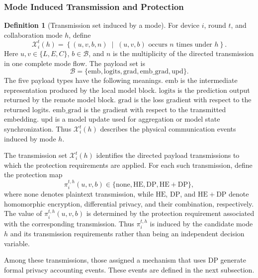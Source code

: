 \documentclass[5p,times]{elsarticle}
\theoremstyle{plain}
\theoremstyle{definition}
\newtheorem{definition}[theorem]{Definition}
\theoremstyle{remark}
\begin{document}
\subsubsection{Mode Induced Transmission and Protection}
\begin{definition}[Transmission set induced by a mode]
For device \(i\), round \(t\), and collaboration mode \(h\), define
\begin{equation}
\mathcal X_i^t(h)
=
\left\{
(u,v,b,n)
\;\middle|\;
(u,v,b)\text{ occurs }n\text{ times under }h
\right\}.
\label{eq:transmission_set}
\end{equation}
Here \(u,v\in\{L,E,C\}\), \(b\in\mathcal B\), and \(n\) is the multiplicity of the directed transmission in one complete mode flow.
The payload set is
\begin{equation*}
\mathcal B=
\{\mathrm{emb},\mathrm{logits},\mathrm{grad},
\mathrm{emb\_grad},\mathrm{upd}\}.
\end{equation*}
The five payload types have the following meanings.
\(\mathrm{emb}\) is the intermediate representation produced by the local model block.
\(\mathrm{logits}\) is the prediction output returned by the remote model block.
\(\mathrm{grad}\) is the loss gradient with respect to the returned logits.
\(\mathrm{emb\_grad}\) is the gradient with respect to the transmitted embedding.
\(\mathrm{upd}\) is a model update used for aggregation or model state synchronization.
Thus \(\mathcal X_i^t(h)\) describes the physical communication events induced by mode \(h\).
\end{definition}
The transmission set \(\mathcal X_i^t(h)\) identifies the directed payload transmissions to which the protection requirements are applied. For each such transmission, define the protection map
\[
\pi_i^{t,h}(u,v,b)
\in
\{\mathrm{none},\mathrm{HE},\mathrm{DP},\mathrm{HE{+}DP}\},
\]
where \(\mathrm{none}\) denotes plaintext transmission, while \(\mathrm{HE}\), \(\mathrm{DP}\), and \(\mathrm{HE{+}DP}\) denote homomorphic encryption, differential privacy, and their combination, respectively. The value of \(\pi_i^{t,h}(u,v,b)\) is determined by the protection requirement associated with the corresponding transmission. Thus \(\pi_i^{t,h}\) is induced by the candidate mode \(h\) and its transmission requirements rather than being an independent decision variable.

Among these transmissions, those assigned a mechanism that uses DP generate formal privacy accounting events. These events are defined in the next subsection.
\end{document}
